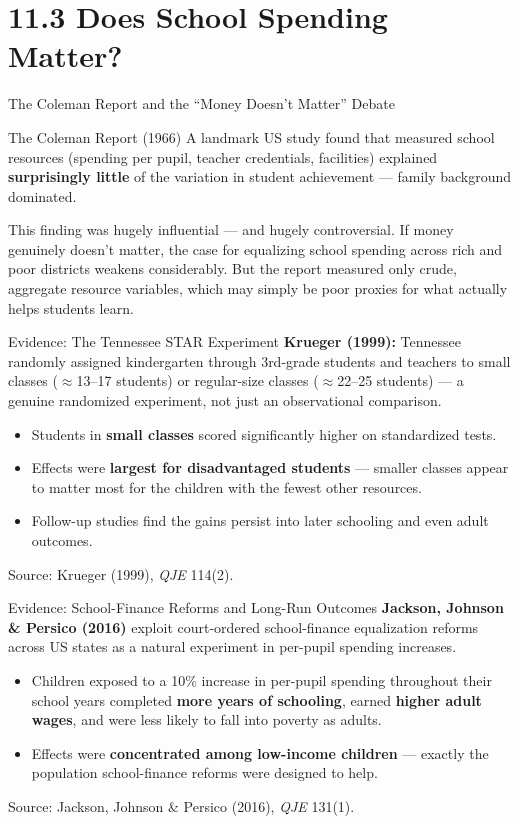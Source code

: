 \documentclass[11pt,aspectratio=169]{beamer}
\newcommand{\srcnote}[1]{{\footnotesize\color{wugray}Source: #1}}
\begin{document}
\section{11.3 Does School Spending Matter?}

\begin{frame}{The Coleman Report and the ``Money Doesn't Matter'' Debate}
  \begin{block}{The Coleman Report (1966)}
    A landmark US study found that measured school resources (spending per pupil, teacher credentials, facilities) explained \textbf{surprisingly little} of the variation in student achievement --- family background dominated.
  \end{block}
  \vspace{0.4em}
  \small This finding was hugely influential --- and hugely controversial. If money genuinely doesn't matter, the case for equalizing school spending across rich and poor districts weakens considerably. But the report measured only crude, aggregate resource variables, which may simply be poor proxies for what actually helps students learn.
\end{frame}

\begin{frame}{Evidence: The Tennessee STAR Experiment}
  \textbf{Krueger (1999):} Tennessee randomly assigned kindergarten through 3rd-grade students and teachers to small classes ($\approx$13--17 students) or regular-size classes ($\approx$22--25 students) --- a genuine randomized experiment, not just an observational comparison.
  \begin{itemize}
    \item Students in \textbf{small classes} scored significantly higher on standardized tests.
    \item Effects were \textbf{largest for disadvantaged students} --- smaller classes appear to matter most for the children with the fewest other resources.
    \item Follow-up studies find the gains persist into later schooling and even adult outcomes.
  \end{itemize}
  \srcnote{Krueger (1999), \emph{QJE} 114(2).}
\end{frame}

\begin{frame}{Evidence: School-Finance Reforms and Long-Run Outcomes}
  \textbf{Jackson, Johnson \& Persico (2016)} exploit court-ordered school-finance equalization reforms across US states as a natural experiment in per-pupil spending increases.
  \begin{itemize}
    \item Children exposed to a 10\% increase in per-pupil spending throughout their school years completed \textbf{more years of schooling}, earned \textbf{higher adult wages}, and were less likely to fall into poverty as adults.
    \item Effects were \textbf{concentrated among low-income children} --- exactly the population school-finance reforms were designed to help.
  \end{itemize}
  \srcnote{Jackson, Johnson \& Persico (2016), \emph{QJE} 131(1).}
\end{frame}
\end{document}
